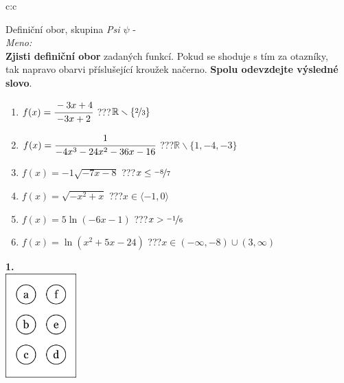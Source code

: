 \documentclass[10pt]{report}
\begin{document}
\begin{tabular}{c:c}
\begin{minipage}[c][99mm][t]{0.49\linewidth}
\begin{center}
\vspace{7mm}
{\huge Definiční obor, skupina \textit{Psi $\psi$} -}\\[4.5mm]
\textit{Meno:}\phantom{xxxxxxxxxxxxxxxxxxxxxxxxxxxxxxxxxxxxxxxxxxxxxxxxxxxxxxxxxxxxxxxxx}\\[3.5mm]
\textbf{Zjisti definiční obor} zadaných funkcí. Pokud se shoduje s tím za otazníky,\\tak napravo obarvi příslušející kroužek načerno. \textbf{Spolu odevzdejte výsledné slovo}.\\[3mm]
\begin{minipage}{0.77\linewidth}
\begin{center}
\begin{varwidth}{\textwidth}
\begin{enumerate}
\normalsize
\item $f(x)=\cfrac{-3x+4}{-3x+2}$\quad \dotfill\; ???\;\dotfill \quad $\mathbb{R}\smallsetminus\{\nicefrac{2}{3}\}$
\item $f(x)=\cfrac{1}{-4x^3-24x^2-36x-16}$\quad \dotfill\; ???\;\dotfill \quad $\mathbb{R}\smallsetminus\{1,-4,-3\}$
\item $f(x)=-1\sqrt{-7x-8}$\quad \dotfill\; ???\;\dotfill \quad $x\leq\nicefrac{-8}{7}$
\item $f(x)=\sqrt{-x^2+x}$\quad \dotfill\; ???\;\dotfill \quad $x\in\langle-1 , 0\rangle$
\item $f(x)=5\ln{(-6x-1)}$\quad \dotfill\; ???\;\dotfill \quad $x>\nicefrac{-1}{6}$
\item $f(x)=\ln{(x^2+5x-24)}$\quad \dotfill\; ???\;\dotfill \quad $x\in(-\infty , -8)\cup(3 , \infty)$
\end{enumerate}
\end{varwidth}
\end{center}
\end{minipage}
\begin{minipage}{0.20\linewidth}
\begin{center}
{\Huge\bfseries 1.} \\[2mm]
\includegraphics[height=40mm]{../images/braille.png}

\end{center}
\end{minipage}
\end{center}
\end{minipage}
\end{tabular}
\end{document}
